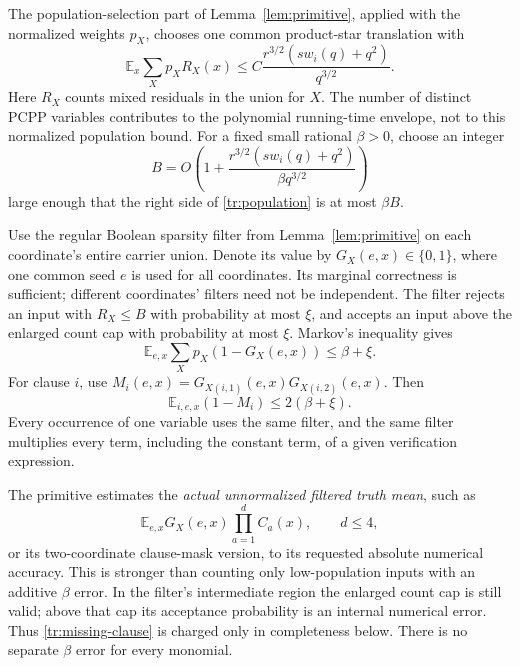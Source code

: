 \documentclass[11pt,letterpaper]{article}
\theoremstyle{definition}
\theoremstyle{remark}
\begin{document}
The population-selection part of Lemma~\ref{lem:primitive}, applied
with the normalized weights $p_X$, chooses one common product-star
translation with
\begin{equation}
 \mathbb E_x\sum_Xp_X R_X(x)
 \le C\frac{r^{3/2}(s w_i(q)+q^2)}{q^{3/2}}.
 \label{tr:population}
\end{equation}
Here $R_X$ counts mixed residuals in the union for $X$.
The number of distinct PCPP variables contributes to the polynomial
running-time envelope, not to this normalized population bound.
For a fixed small rational $\beta>0$, choose an integer
\begin{equation}
 B=O\left(1+
 \frac{r^{3/2}(s w_i(q)+q^2)}{\beta q^{3/2}}\right)
 \label{tr:B}
\end{equation}
large enough that the right side of \eqref{tr:population} is at most
$\beta B$.

Use the regular Boolean sparsity filter from
Lemma~\ref{lem:primitive} on each coordinate's entire carrier union.
Denote its value by $G_X(e,x)\in\{0,1\}$, where one common seed $e$
is used for all coordinates. Its marginal correctness is sufficient;
different coordinates' filters need not be independent.
The filter rejects an input with $R_X\le B$ with probability at most
$\xi$, and accepts an input above the enlarged count cap with
probability at most $\xi$. Markov's inequality gives
\begin{equation}
 \mathbb E_{e,x}\sum_Xp_X(1-G_X(e,x))\le\beta+\xi.
 \label{tr:missing}
\end{equation}
For clause $i$, use
$M_i(e,x)=G_{X(i,1)}(e,x)G_{X(i,2)}(e,x)$.
Then
\begin{equation}
 \mathbb E_{i,e,x}(1-M_i)\le2(\beta+\xi).
 \label{tr:missing-clause}
\end{equation}
Every occurrence of one variable uses the same filter, and the same
filter multiplies every term, including the constant term, of a
given verification expression.

The primitive estimates the \emph{actual unnormalized filtered truth
mean}, such as
\[
 \mathbb E_{e,x}G_X(e,x)\prod_{a=1}^{d}C_a(x),\qquad d\le4,
\]
or its two-coordinate clause-mask version, to its requested absolute
numerical accuracy. This is stronger than counting only low-population
inputs with an additive $\beta$ error. In the filter's intermediate
region the enlarged count cap is still valid; above that cap its
acceptance probability is an internal numerical error. Thus
\eqref{tr:missing-clause} is charged only in completeness below.
There is no separate $\beta$ error for every monomial.
\end{document}
